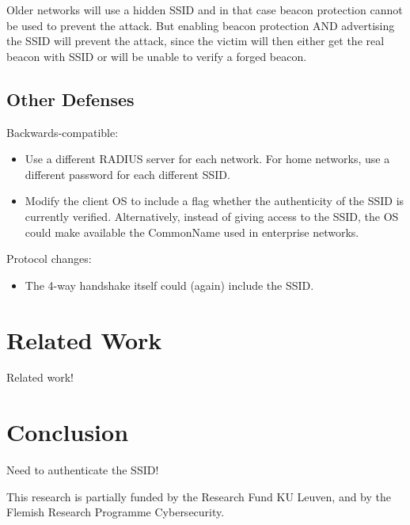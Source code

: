 \documentclass[sigconf,review]{acmart}
\begin{document}
Older networks will use a hidden SSID and in that case beacon protection cannot be used to prevent the attack.
But enabling beacon protection AND advertising the SSID will prevent the attack, since the victim will then either get the real beacon with SSID or will be unable to verify a forged beacon.

\subsection{Other Defenses}

Backwards-compatible:
\begin{itemize}
	\item Use a different RADIUS server for each network.
	For home networks, use a different password for each different SSID.
	\item Modify the client OS to include a flag whether the authenticity of the SSID is currently verified.
	Alternatively, instead of giving access to the SSID, the OS could make available the CommonName used in enterprise networks.
\end{itemize}

Protocol changes:
\begin{itemize}
	\item The 4-way handshake itself could (again) include the SSID.
\end{itemize}


\section{Related Work}
\label{sec:relatedwork}

Related work!

\section{Conclusion}
\label{sec:conclusion}

Need to authenticate the SSID!

\begin{acks}
This research is partially funded by the Research Fund KU Leuven, and by the Flemish Research Programme Cybersecurity.
\end{acks}




\end{document}
